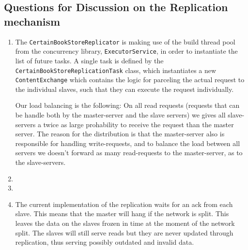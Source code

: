 \documentclass[10pt,a4paper]{article}
\begin{document}
\subsection*{Questions for Discussion on the Replication mechanism}
\begin{enumerate}
	\item The \texttt{CertainBookStoreReplicator} is making use of the build thread pool from the concurrency library, \texttt{ExecutorService}, in order to instantiate the list of future tasks. A single task is defined by the \texttt{CertainBookStore\-ReplicationTask} class, which instantiates a new \texttt{ContentExchange} which contains the logic for parceling the actual request to the individual slaves, such that they can execute the request individually.
	\newline
	
	Our load balancing is the following: On all read requests (requests that can be handle both by the master-server and the slave servers) we gives all slave-servers a twice as large prohability to receive the request than the master server. The reason for the distribution is that the master-server also is responsible for handling write-requests, and to balance the load between all servers we doesn't forward as many read-requests to the master-server, as to the slave-servers.
	\item
	\item
	\item The current implementation of the replication waits for an ack from each slave. This means that the master will hang if the network is split. This leaves the data on the slaves frozen in time at the moment of the network split. The slaves will still serve reads but they are never updated through replication, thus serving possibly outdated and invalid data.
\end{enumerate}
\end{document}
